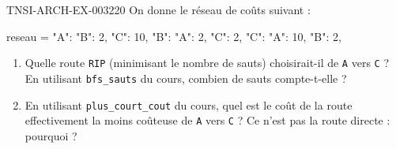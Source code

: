 \begin{exercice}{TNSI-ARCH-EX-003}{2}{20}
On donne le réseau de coûts suivant :
\begin{python}
reseau = {
    "A": {"B": 2, "C": 10},
    "B": {"A": 2, "C": 2},
    "C": {"A": 10, "B": 2},
}
\end{python}
\begin{enumerate}
  \item Quelle route \texttt{RIP} (minimisant le nombre de sauts) choisirait-il de \texttt{A} vers \texttt{C} ? En utilisant \lstinline{bfs_sauts} du cours, combien de sauts compte-t-elle ?
  \item En utilisant \lstinline{plus_court_cout} du cours, quel est le coût de la route effectivement la moins coûteuse de \texttt{A} vers \texttt{C} ? Ce n'est pas la route directe : pourquoi ?
\end{enumerate}
\end{exercice}
